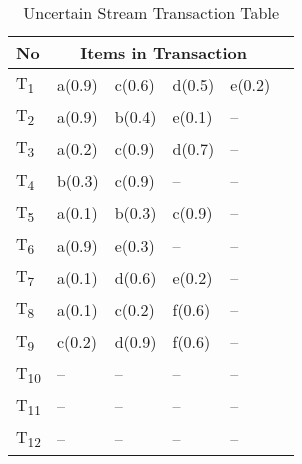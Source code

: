 \documentclass{article}
\begin{document}
\begin{table}[ht]
\centering

\begin{tabular}{|l|l|l|l|l|l|}
\hline
	No & \multicolumn{4}{c|}{Items in Transaction} \\ \hline \hline
	T\textsubscript{1} & a(0.9) & c(0.6) & d(0.5) & e(0.2)			\\\hline
	T\textsubscript{2} & a(0.9) & b(0.4) & e(0.1) & --    			\\\hline
	T\textsubscript{3} & a(0.2) & c(0.9) & d(0.7) & --    			\\\hline
	T\textsubscript{4} & b(0.3) & c(0.9) & -- & --			\\\hline
	T\textsubscript{5} & a(0.1) & b(0.3) & c(0.9) & --    			\\\hline
	T\textsubscript{6} & a(0.9) & e(0.3) & -- & --        			\\\hline
   	T\textsubscript{7} & a(0.1) & d(0.6) & e(0.2) & --		\\\hline
	T\textsubscript{8} & a(0.1) & c(0.2) & f(0.6) & --    			\\\hline
	T\textsubscript{9} & c(0.2) & d(0.9) & f(0.6) & --    			\\\hline
	
	T\textsubscript{10} &  --  &  --  &  --  & --    				\\\hline
	T\textsubscript{11} &  --  &  --  &  --  & --    				\\\hline
	T\textsubscript{12} &  --  &  --  &  --  & --    				\\\hline
	
		
\end{tabular}
\label{tab:ex_u}
\caption{Uncertain Stream Transaction Table}
\label{table:uncertain_stream_transaction}
\end{table}
\end{document}
